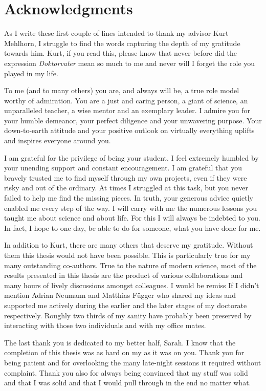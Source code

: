 \null\vfill

\section*{Acknowledgments}
	
	As I write these first couple of lines intended to thank my advisor Kurt Mehlhorn, I struggle to find the words capturing the depth of my gratitude towards him. Kurt, if you read this, please know that never before did the expression \emph{Doktorvater} mean so much to me and never will I forget the role you played in my life. 

	To me (and to many others) you are, and always will be, a true role model worthy of admiration. You are a just and caring person, a giant of science, an unparalleled teacher, a wise mentor and an exemplary leader. I admire you for your humble demeanor, your perfect diligence and your unwavering purpose. Your down-to-earth attitude and your positive outlook on virtually everything uplifts and inspires everyone around you.

	I am grateful for the privilege of being your student. I feel extremely humbled by your unending support and constant encouragement. I am grateful that you bravely trusted me to find myself through my own projects, even if they were risky and out of the ordinary. At times I struggled at this task, but you never failed to help me find the missing pieces. In truth, your generous advice quietly enabled me every step of the way. I will carry with me the numerous lessons you taught me about science and about life. For this I will always be indebted to you. In fact, I hope to one day, be able to do for someone, what you have done for me.\bigskip
	
	In addition to Kurt, there are many others that deserve my gratitude. Without them this thesis would not have been possible. This is particularly true for my many outstanding co-authors. True to the nature of modern science, most of the results presented in this thesis are the product of various collaborations and many hours of lively discussions amongst colleagues. I would be remiss If I didn't mention Adrian Neumann and Matthias F\"ugger who shared my ideas and supported me actively during the earlier and the later stages of my doctorate respectively. Roughly two thirds of my sanity have probably been preserved by interacting with those two individuals and with my office mates.\bigskip

	The last thank you is dedicated to my better half, Sarah. I know that the completion of this thesis was as hard on my as it was on you. Thank you for being patient and for overlooking the many late-night sessions it required without complaint. Thank you also for always being convinced that my stuff was solid and that I was solid and that I would pull through in the end no matter what.


